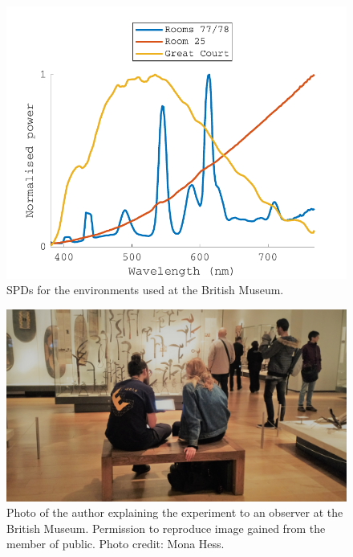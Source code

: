 \begin{figure}[hbtp]
\includegraphics[max width=\textwidth]{figs/tablet/BM_SPD.pdf}
\caption{\gls{SPD}s for the environments used at the British Museum.} 
\label{fig:BM_SPD}
\end{figure}

\begin{figure}[hbtp]
\includegraphics[max width=\textwidth]{figs/tablet/BM_Africa.jpg}
\caption{Photo of the author explaining the experiment to an observer at the British Museum. Permission to reproduce image gained from the member of public. Photo credit: Mona Hess.}
\label{fig:BM_Africa}
\end{figure}

